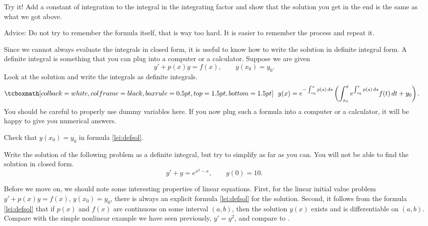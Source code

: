 \begin{exercise}
Try it!  Add a constant of integration to the integral in
the integrating factor and show that the solution you get in the end is the
same as what we got above.
\end{exercise}

Advice: Do not try to remember the formula itself, that is way too
hard.  It is easier to remember the process and repeat it.

Since we cannot always evaluate the integrals in closed form, it is useful to
know how to write the solution in definite integral form.  A definite
integral is something that
you can plug into a computer or a calculator.  Suppose we are given
\begin{equation*}
y' + p(x) y = f(x) , \qquad y(x_0) = y_0 .
\end{equation*}
Look at the solution and write the integrals
as definite integrals.
\begin{equation} \label{lei:defsol}
\mybxbg{
~~
y(x) = e^{-\int_{x_0}^x p(s)\, ds} \left( \int_{x_0}^x e^{\int_{x_0}^t p(s)\, ds}
f(t) \,dt + y_0 \right).
~~
}
\end{equation}
You should
be careful to properly use dummy variables here.  If you now plug such a
formula into a
computer or a calculator, it will be happy to give you numerical answers.

\begin{exercise}
Check that $y(x_0) = y_0$ in formula \eqref{lei:defsol}.
\end{exercise}

\begin{exercise}
Write the solution of the following problem
as a definite integral, but try to simplify as far as you can.  You will not
be able to find the solution in closed form.
\begin{equation*}
y' + y = e^{x^2-x}, \qquad y(0) = 10 .
\end{equation*}
\end{exercise}

\begin{remark}
Before we move on, we should note some interesting properties of linear
equations.  First, for the linear initial value problem
$y' + p(x) y = f(x)$, $y(x_0) = y_0$,
there is always an explicit formula \eqref{lei:defsol} for the
solution.  Second, it follows
from the formula \eqref{lei:defsol} that if $p(x)$
and $f(x)$ are continuous on some interval $(a,b)$, then the 
solution $y(x)$ exists and is differentiable on $(a,b)$.  Compare
with the simple nonlinear example we have seen previously, $y'=y^2$,
and compare to .
\end{remark}


